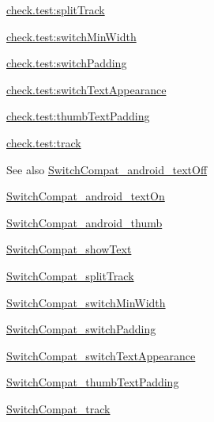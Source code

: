 {\ttfamily \hyperlink{classcheck_1_1test_1_1_r_1_1styleable_a2209e4bf912668ea5826e5f0fbb4196e}{check.\+test\+:split\+Track}}

{\ttfamily \hyperlink{classcheck_1_1test_1_1_r_1_1styleable_a5008f56d15445e1e76705edbb100cbd3}{check.\+test\+:switch\+Min\+Width}}

{\ttfamily \hyperlink{classcheck_1_1test_1_1_r_1_1styleable_a91263d5b37a23dd554977465783c67bd}{check.\+test\+:switch\+Padding}}

{\ttfamily \hyperlink{classcheck_1_1test_1_1_r_1_1styleable_a89ea5d1aeeef77c9a3dad277bdab7d07}{check.\+test\+:switch\+Text\+Appearance}}

{\ttfamily \hyperlink{classcheck_1_1test_1_1_r_1_1styleable_a95c824ebefc72184d7d92ae14058c7c4}{check.\+test\+:thumb\+Text\+Padding}}

{\ttfamily \hyperlink{classcheck_1_1test_1_1_r_1_1styleable_a96e29bef8e291fd5b97d301aaab3e463}{check.\+test\+:track}}

\begin{DoxySeeAlso}{See also}
\hyperlink{classcheck_1_1test_1_1_r_1_1styleable_ab84183d5d84d551d811f6b8114e6cf0c}{Switch\+Compat\+\_\+android\+\_\+text\+Off} 

\hyperlink{classcheck_1_1test_1_1_r_1_1styleable_a23563184e5ab5fb5a8d99269e8aba6cb}{Switch\+Compat\+\_\+android\+\_\+text\+On} 

\hyperlink{classcheck_1_1test_1_1_r_1_1styleable_a22ffd7de92a4d9d0703e1c36ee15e59c}{Switch\+Compat\+\_\+android\+\_\+thumb} 

\hyperlink{classcheck_1_1test_1_1_r_1_1styleable_a8156a68b3d19ff2ccc3cac1451ba5aa1}{Switch\+Compat\+\_\+show\+Text} 

\hyperlink{classcheck_1_1test_1_1_r_1_1styleable_a2209e4bf912668ea5826e5f0fbb4196e}{Switch\+Compat\+\_\+split\+Track} 

\hyperlink{classcheck_1_1test_1_1_r_1_1styleable_a5008f56d15445e1e76705edbb100cbd3}{Switch\+Compat\+\_\+switch\+Min\+Width} 

\hyperlink{classcheck_1_1test_1_1_r_1_1styleable_a91263d5b37a23dd554977465783c67bd}{Switch\+Compat\+\_\+switch\+Padding} 

\hyperlink{classcheck_1_1test_1_1_r_1_1styleable_a89ea5d1aeeef77c9a3dad277bdab7d07}{Switch\+Compat\+\_\+switch\+Text\+Appearance} 

\hyperlink{classcheck_1_1test_1_1_r_1_1styleable_a95c824ebefc72184d7d92ae14058c7c4}{Switch\+Compat\+\_\+thumb\+Text\+Padding} 

\hyperlink{classcheck_1_1test_1_1_r_1_1styleable_a96e29bef8e291fd5b97d301aaab3e463}{Switch\+Compat\+\_\+track} 
\end{DoxySeeAlso}
\hypertarget{classcheck_1_1test_1_1_r_1_1styleable_ab84183d5d84d551d811f6b8114e6cf0c}{}
